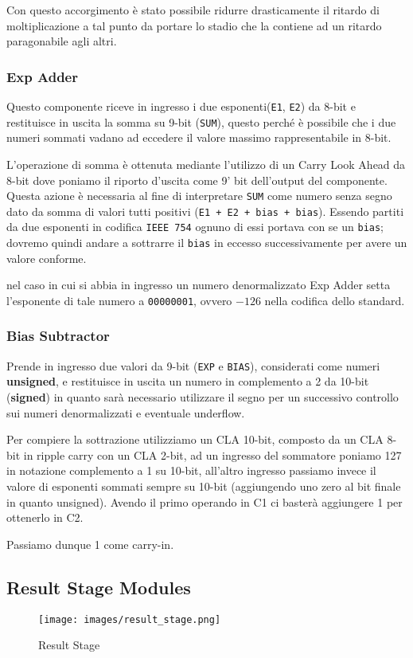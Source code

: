 \documentclass[twoside,11pt]{article}
\begin{document}
{Con questo accorgimento è stato possibile ridurre drasticamente il ritardo di moltiplicazione a tal punto da portare lo stadio che la contiene ad un ritardo paragonabile agli altri.

\subsubsection{Exp Adder}
Questo componente riceve in ingresso i due esponenti(\verb|E1|, \verb|E2|) da 8-bit e restituisce in uscita la somma su 9-bit (\verb|SUM|), questo perché è possibile che i due numeri sommati vadano ad eccedere il valore massimo rappresentabile in 8-bit.

L’operazione di somma è ottenuta mediante l’utilizzo di un Carry Look Ahead da 8-bit dove poniamo il riporto d’uscita come 9' bit dell'output del componente.
Questa azione è necessaria al fine di interpretare \verb|SUM| come numero senza segno dato da somma di valori tutti positivi (\verb|E1 + E2 + bias + bias|). Essendo partiti da due esponenti in codifica \verb|IEEE 754| ognuno di essi portava con se un \verb|bias|; dovremo quindi andare a sottrarre il \verb|bias| in eccesso successivamente per avere un valore conforme.

nel caso in cui si abbia in ingresso un numero denormalizzato Exp Adder setta l’esponente di tale numero a \verb|00000001|, ovvero $-126$ nella codifica dello standard.

\subsubsection{Bias Subtractor}
Prende in ingresso due valori da 9-bit (\verb|EXP| e \verb|BIAS|), considerati come numeri \textbf{unsigned}, e restituisce in uscita un numero in complemento a 2 da 10-bit (\textbf{signed}) in quanto sarà necessario utilizzare il segno per un successivo controllo sui numeri denormalizzati e eventuale underflow.

Per compiere la sottrazione utilizziamo un CLA 10-bit, composto da un CLA 8-bit in ripple carry con un CLA 2-bit, ad un ingresso del sommatore poniamo 127 in notazione complemento a 1 su 10-bit, all'altro ingresso passiamo invece il valore di esponenti sommati sempre su 10-bit (aggiungendo uno zero al bit finale in quanto unsigned).
Avendo il primo operando in C1 ci basterà aggiungere 1 per ottenerlo in C2.

Passiamo dunque 1 come carry-in.
\subsection{Result Stage Modules}
\begin{figure}[h!]
    \centering
    \texttt{[image: images/result\_stage.png]}
    \caption{Result Stage}
    \label{fig:result-stage}
\end{figure}

}
\end{document}
